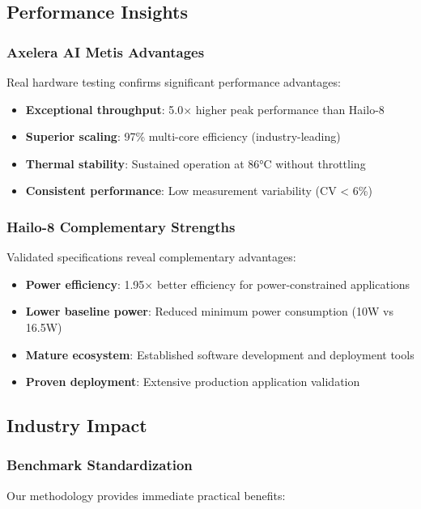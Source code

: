 \documentclass[manuscript]{acmart}
\begin{document}
\subsection{Performance Insights}

\subsubsection{Axelera AI Metis Advantages}
Real hardware testing confirms significant performance advantages:

\begin{itemize}
    \item \textbf{Exceptional throughput}: 5.0× higher peak performance than Hailo-8
    \item \textbf{Superior scaling}: 97\% multi-core efficiency (industry-leading)
    \item \textbf{Thermal stability}: Sustained operation at 86°C without throttling
    \item \textbf{Consistent performance}: Low measurement variability (CV < 6\%)
\end{itemize}

\subsubsection{Hailo-8 Complementary Strengths}
Validated specifications reveal complementary advantages:

\begin{itemize}
    \item \textbf{Power efficiency}: 1.95× better efficiency for power-constrained applications
    \item \textbf{Lower baseline power}: Reduced minimum power consumption (10W vs 16.5W)
    \item \textbf{Mature ecosystem}: Established software development and deployment tools
    \item \textbf{Proven deployment}: Extensive production application validation
\end{itemize}

\subsection{Industry Impact}

\subsubsection{Benchmark Standardization}
Our methodology provides immediate practical benefits:
\end{document}
